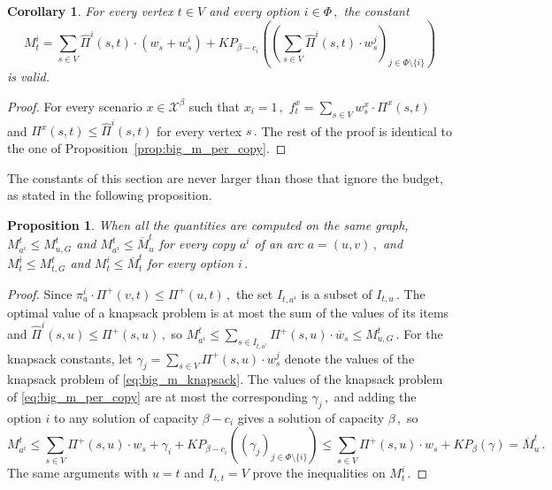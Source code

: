\documentclass[11pt,a4paper]{report}
\newtheorem{corollary}[theorem]{Corollary}
\newtheorem{proposition}[theorem]{Proposition}
\theoremstyle{definition}
\theoremstyle{remark}
\begin{document}
\begin{corollary}\label{corollary:big_m_mccormick}
  For every vertex $t \in V$ and every option $i \in \Phi\,,$ the constant
  \begin{equation}\label{eq:big_m_mccormick}
    M^i_t = \sum_{s \in V} \widehat{\Pi}^i(s,t) \cdot \left(w_s + w^i_s\right) + KP_{\beta - c_i}\left(\left(\sum_{s \in V} \widehat{\Pi}^i(s,t) \cdot w^j_s\right)_{j \in \Phi \setminus \{i\}}\right)
  \end{equation}
  is valid.
\end{corollary}

\begin{proof}
  For every scenario $x \in \mathcal{X}^\beta$ such that $x_i = 1\,,$ $f^x_t = \sum_{s \in V} w^x_s \cdot \Pi^x(s,t)$ and $\Pi^x(s,t) \leq \widehat{\Pi}^i(s,t)$ for every vertex $s\,.$ The rest of the proof is identical to the one of Proposition~\ref{prop:big_m_per_copy}.
\end{proof}

The constants of this section are never larger than those that ignore the budget, as stated in the following proposition.

\begin{proposition}\label{prop:big_m_comparison}
  When all the quantities are computed on the same graph, $M^t_{a^i} \leq M^t_{u,G}$ and $M^t_{a^i} \leq \overline{M}^t_u$ for every copy $a^i$ of an arc $a = (u,v)\,,$ and $M^i_t \leq M^t_{t,G}$ and $M^i_t \leq \overline{M}^t_t$ for every option $i\,.$
\end{proposition}

\begin{proof}
  Since $\pi^i_a \cdot \Pi^+(v,t) \leq \Pi^+(u,t)\,,$ the set $I_{t,a^i}$ is a subset of $I_{t,u}\,.$ The optimal value of a knapsack problem is at most the sum of the values of its items and $\widehat{\Pi}^i(s,u) \leq \Pi^+(s,u)\,,$ so $M^t_{a^i} \leq \sum_{s \in I_{t,a^i}} \Pi^+(s,u) \cdot \overline{w}_s \leq M^t_{u,G}\,.$ For the knapsack constants, let $\gamma_j = \sum_{s \in V} \Pi^+(s,u) \cdot w^j_s$ denote the values of the knapsack problem of \eqref{eq:big_m_knapsack}. The values of the knapsack problem of \eqref{eq:big_m_per_copy} are at most the corresponding $\gamma_j\,,$ and adding the option $i$ to any solution of capacity $\beta - c_i$ gives a solution of capacity $\beta\,,$ so
  \begin{equation}
    M^t_{a^i} \leq \sum_{s \in V} \Pi^+(s,u) \cdot w_s + \gamma_i + KP_{\beta - c_i}\left((\gamma_j)_{j \in \Phi \setminus \{i\}}\right) \leq \sum_{s \in V} \Pi^+(s,u) \cdot w_s + KP_\beta(\gamma) = \overline{M}^t_u\,.
  \end{equation}
  The same arguments with $u = t$ and $I_{t,t} = V$ prove the inequalities on $M^i_t\,.$
\end{proof}
\end{document}
